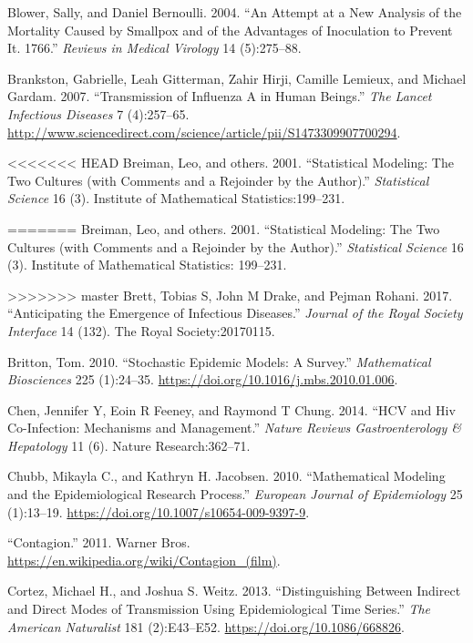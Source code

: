 \documentclass[]{book}
\theoremstyle{definition}
\theoremstyle{definition}
\theoremstyle{definition}
\theoremstyle{remark}
\begin{document}
\leavevmode\hypertarget{ref-blower04}{}%
Blower, Sally, and Daniel Bernoulli. 2004. ``An Attempt at a New
Analysis of the Mortality Caused by Smallpox and of the Advantages of
Inoculation to Prevent It. 1766.'' \emph{Reviews in Medical Virology} 14
(5):275--88.

\leavevmode\hypertarget{ref-brankston07}{}%
Brankston, Gabrielle, Leah Gitterman, Zahir Hirji, Camille Lemieux, and
Michael Gardam. 2007. ``Transmission of Influenza A in Human Beings.''
\emph{The Lancet Infectious Diseases} 7 (4):257--65.
\url{http://www.sciencedirect.com/science/article/pii/S1473309907700294}.

<<<<<<< HEAD
\leavevmode\hypertarget{ref-breiman01}{}%
Breiman, Leo, and others. 2001. ``Statistical Modeling: The Two Cultures
(with Comments and a Rejoinder by the Author).'' \emph{Statistical
Science} 16 (3). Institute of Mathematical Statistics:199--231.

\leavevmode\hypertarget{ref-brett17}{}%
=======
\hypertarget{ref-breiman01}{}
Breiman, Leo, and others. 2001. ``Statistical Modeling: The Two Cultures
(with Comments and a Rejoinder by the Author).'' \emph{Statistical
Science} 16 (3). Institute of Mathematical Statistics: 199--231.

\hypertarget{ref-brett17}{}
>>>>>>> master
Brett, Tobias S, John M Drake, and Pejman Rohani. 2017. ``Anticipating
the Emergence of Infectious Diseases.'' \emph{Journal of the Royal
Society Interface} 14 (132). The Royal Society:20170115.

\leavevmode\hypertarget{ref-britton10a}{}%
Britton, Tom. 2010. ``Stochastic Epidemic Models: A Survey.''
\emph{Mathematical Biosciences} 225 (1):24--35.
\url{https://doi.org/10.1016/j.mbs.2010.01.006}.

\leavevmode\hypertarget{ref-chen14}{}%
Chen, Jennifer Y, Eoin R Feeney, and Raymond T Chung. 2014. ``HCV and
Hiv Co-Infection: Mechanisms and Management.'' \emph{Nature Reviews
Gastroenterology \& Hepatology} 11 (6). Nature Research:362--71.

\leavevmode\hypertarget{ref-chubb10}{}%
Chubb, Mikayla C., and Kathryn H. Jacobsen. 2010. ``Mathematical
Modeling and the Epidemiological Research Process.'' \emph{European
Journal of Epidemiology} 25 (1):13--19.
\url{https://doi.org/10.1007/s10654-009-9397-9}.

\leavevmode\hypertarget{ref-contagionmovie}{}%
``Contagion.'' 2011. Warner Bros.
\url{https://en.wikipedia.org/wiki/Contagion_(film)}.

\leavevmode\hypertarget{ref-cortez13}{}%
Cortez, Michael H., and Joshua S. Weitz. 2013. ``Distinguishing Between
Indirect and Direct Modes of Transmission Using Epidemiological Time
Series.'' \emph{The American Naturalist} 181 (2):E43--E52.
\url{https://doi.org/10.1086/668826}.
\end{document}

